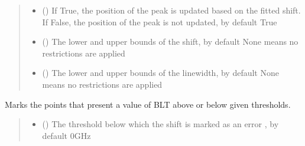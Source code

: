 \documentclass[letterpaper,10pt,english]{sphinxmanual}
\begin{document}
\begin{fulllineitems}
\begin{fulllineitems}
\begin{quote}
\begin{description}
\begin{itemize}
\item {} 
\sphinxAtStartPar
{} (\sphinxstyleliteralemphasis{\sphinxupquote{, }}) \textendash{} If True, the position of the peak is updated based on the fitted shift. If False, the position of the peak is not updated, by default True

\item {} 
\sphinxAtStartPar
{} (\sphinxstyleliteralemphasis{\sphinxupquote{, }}) \textendash{} The lower and upper bounds of the shift, by default None means no restrictions are applied

\item {} 
\sphinxAtStartPar
{} (\sphinxstyleliteralemphasis{\sphinxupquote{, }}) \textendash{} The lower and upper bounds of the linewidth, by default None means no restrictions are applied

\end{itemize}

\end{description}\end{quote}

\end{fulllineitems}


\begin{fulllineitems}
\label{\detokenize{source/_autosummary/HDF5_BLS_treat.Treat:HDF5_BLS_treat.Treat.mark_errors_BLT}}
\pysigstartsignatures
\pysiglinewithargsret
{}
{\sphinxparamcomma {}}
{}
\pysigstopsignatures
\sphinxAtStartPar
Marks the points that present a value of BLT above or below given thresholds.
\begin{quote}\begin{description}
\begin{itemize}
\item {} 
\sphinxAtStartPar
{} (\sphinxstyleliteralemphasis{\sphinxupquote{, }}) \textendash{} The threshold below which the shift is marked as an error , by default 0GHz


\end{itemize}
\end{description}
\end{quote}
\end{fulllineitems}
\end{fulllineitems}
\end{document}
